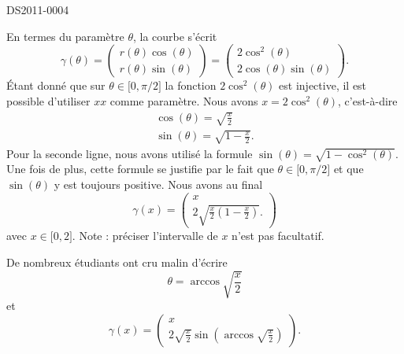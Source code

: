 \begin{corrige}{DS2011-0004}
  
    En termes du paramètre \( \theta\), la courbe s'écrit
    \begin{equation}
        \gamma(\theta)=\begin{pmatrix}
            r(\theta)\cos(\theta)    \\ 
            r(\theta)\sin(\theta)    
        \end{pmatrix}=
        \begin{pmatrix}
            2\cos^2(\theta)    \\ 
            2\cos(\theta)\sin(\theta)    
        \end{pmatrix}.
    \end{equation}
    Étant donné que sur \( \theta\in\mathopen[ 0 , \pi/2 \mathclose]\) la fonction \( 2\cos^2(\theta)\) est injective, il est possible d'utiliser \( x x\) comme paramètre. Nous avons \( x=2\cos^2(\theta)\), c'est-à-dire
    \begin{subequations}
        \begin{align}
            \cos(\theta)=\sqrt{\frac{ x }{2}}\\
            \sin(\theta)=\sqrt{1-\frac{ x }{2}}.
        \end{align}
    \end{subequations}
    Pour la seconde ligne, nous avons utilisé la formule \( \sin(\theta)=\sqrt{1-\cos^2(\theta)}\). Une fois de plus, cette formule se justifie par le fait que \( \theta\in\mathopen[ 0 , \pi/2 \mathclose]\) et que \( \sin(\theta)\) y est toujours positive. Nous avons au final
    \begin{equation}
        \gamma(x)=\begin{pmatrix}
            x    \\ 
            2\sqrt{\frac{ x }{2}\left( 1-\frac{ x }{2} \right)}.    
        \end{pmatrix}
    \end{equation}
    avec \( x\in\mathopen[ 0 , 2 \mathclose]\). Note : préciser l'intervalle de \( x \) n'est pas facultatif.

    De nombreux étudiants ont cru malin d'écrire
    \begin{equation}
        \theta=\arccos\sqrt{\frac{ x }{ 2 }}
    \end{equation}
    et
    \begin{equation}        \label{EqCartfgxygammaqnn}
        \gamma(x)=\begin{pmatrix}
            x    \\ 
            2\sqrt{\frac{ x }{2}}\sin\left( \arccos\sqrt{\frac{ x }{2}} \right)
        \end{pmatrix}.
    \end{equation}
    

\end{corrige}
